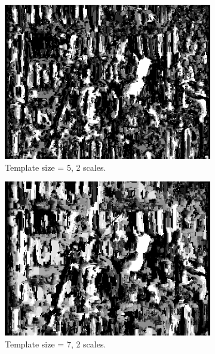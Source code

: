 \documentclass[12pt,a4paper,oneside,final]{article}
\begin{document}
	\begin{figure}[H]
		\ContinuedFloat
		\begin{subfigure}[b]{0.24\textwidth}
			\includegraphics[width=\textwidth]{disparity_s2_k5set_1.png}
			\caption{Template size = 5, 2 scales.}
		\end{subfigure}
		\begin{subfigure}[b]{0.24\textwidth}
			\includegraphics[width=\textwidth]{disparity_s2_k7set_1.png}
			\caption{Template size = 7, 2 scales.}
		\end{subfigure}
		\begin{subfigure}[b]{0.24\textwidth}

\end{subfigure}
\end{figure}
\end{document}
